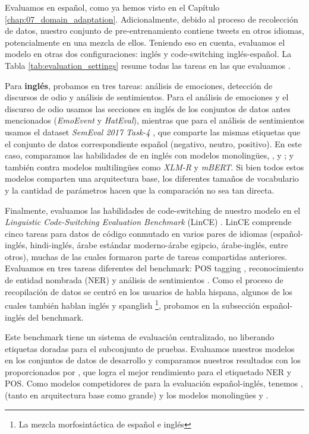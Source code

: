 Evaluamos \robertuito{} en español, como ya hemos visto en el Capítulo \ref{chap:07_domain_adaptation}. Adicionalmente, debido al proceso de recolección de datos, nuestro conjunto de pre-entrenamiento contiene tweets en otros idiomas, potencialmente en una mezcla de ellos. Teniendo eso en cuenta, evaluamos el modelo en otras dos configuraciones: inglés y code-switching inglés-español. La Tabla \ref{tab:evaluation_settings} resume todas las tareas en las que evaluamos \robertuito{}.

Para \textbf{inglés}, probamos \robertuito{} en tres tareas: análisis de emociones, detección de discursos de odio y análisis de sentimientos. Para el análisis de emociones y el discurso de odio usamos las secciones en inglés de los conjuntos de datos antes mencionados (\emph{EmoEvent} y \emph{HatEval}), mientras que para el análisis de sentimientos usamos el dataset \emph{SemEval 2017 Task-4} \cite{rosenthal-2017-semeval}, que comparte las mismas etiquetas que el conjunto de datos correspondiente español (negativo, neutro, positivo). En este caso, comparamos las habilidades de \robertuito{} en inglés con modelos monolingües, \bert{}, \roberta{} y \bertweet{}; y también contra modelos multilingües como \emph{XLM-R} \cite{conneau-2020-xlm} y \emph{mBERT}. Si bien todos estos modelos comparten una arquitectura base, los diferentes tamaños de vocabulario y la cantidad de parámetros hacen que la comparación no sea tan directa.

\newcommand{\lince}[0]{LinCE}

Finalmente, evaluamos las habilidades de code-switching de nuestro modelo en el \emph{Linguistic Code-Switching Evaluation Benchmark} (\lince{}) \cite{aguilar-etal-2020-lince}. \lince{} comprende cinco tareas para datos de código conmutado en varios pares de idiomas (español-inglés, hindi-inglés, árabe estándar moderno-árabe egipcio, árabe-inglés, entre otros), muchas de las cuales formaron parte de tareas compartidas anteriores. Evaluamos \robertuito{} en tres tareas diferentes del benchmark: POS tagging \cite{alghamdi-etal-2016-part}, reconocimiento de entidad nombrada (NER) y análisis de sentimientos \cite{patwa2020sentimix}. Como el proceso de recopilación de datos se centró en los usuarios de habla hispana, algunos de los cuales también hablan inglés y spanglish \footnote{La mezcla morfosintáctica de español e inglés}, probamos \robertuito{} en la subsección español-inglés del benchmark.

Este benchmark tiene un sistema de evaluación centralizado, no liberando etiquetas doradas para el subconjunto de pruebas. Evaluamos nuestros modelos en los conjuntos de datos de desarrollo y comparamos nuestros resultados con los proporcionados por \citet{winata-etal-2021-multilingual}, que logra el mejor rendimiento para el etiquetado NER y POS. Como modelos competidores de \robertuito{} para la evaluación español-inglés, tenemos \mbert{}, \xlm{} (tanto en arquitectura base como grande) y los modelos monolingües \bert{} y \beto{}.


